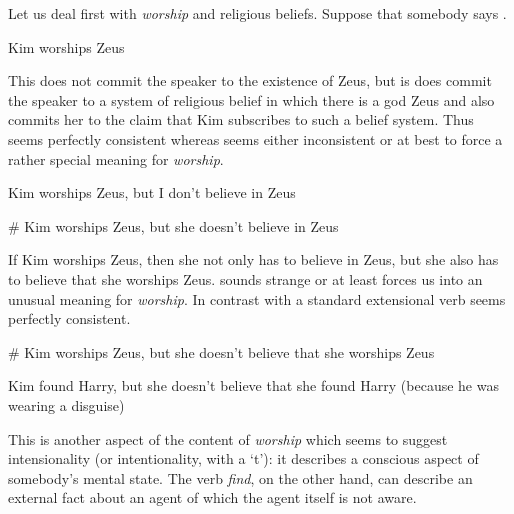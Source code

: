 Let us deal first with \textit{worship} and religious beliefs.
Suppose that somebody says \nexteg{}.
\begin{ex} 
Kim worships Zeus
\label{ex:Kim-worships-Zeus} 
\end{ex} 
This does not commit the speaker to the existence of Zeus, but is does
commit the speaker to a system of religious belief in which there is a
god Zeus and also commits her to the claim that Kim subscribes to such
a belief system.  Thus  seems perfectly consistent whereas
 seems either inconsistent or at best to force a rather
special meaning for \textit{worship}.
\begin{ex} 
\begin{subex} 
 
\item Kim worships Zeus, but I don't believe in Zeus 
 
\item \# Kim worships Zeus, but she doesn't believe in Zeus 
 
\end{subex} 
   
\end{ex} 
If Kim worships Zeus, then she not only has to believe in Zeus, but
she also has to believe that she worships Zeus.   sounds
strange or at least forces us into an unusual meaning for
\textit{worship}.  In contrast  with a standard extensional
verb seems perfectly consistent.
\begin{ex} 
\begin{subex} 
 
\item \# Kim worships Zeus, but she doesn't believe that she worships Zeus 
 
\item Kim found Harry, but she doesn't believe that she found Harry
  (because he was wearing a disguise) 
 
\end{subex} 
   
\end{ex} 
This is another aspect of the content of \textit{worship} which seems
to suggest intensionality (or intentionality, with a `t'):  it
describes a conscious aspect of somebody's mental state.  The verb
\textit{find}, on the other hand, can describe an external fact about
an agent of which the agent itself is not aware.  
  
